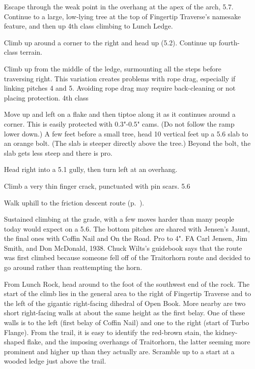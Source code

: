 \documentclass{tahquitz}
\begin{document}
 Escape through the weak point in the overhang at the apex
of the arch, 5.7. Continue to a large, low-lying tree at the top of Fingertip Traverse's
namesake feature, and then up 4th class climbing to Lunch Ledge.


 Climb up around a corner to the right and head up (5.2).
Continue up fourth-class terrain.

 Climb up from the middle of the ledge, surmounting all the steps
before traversing right. This variation creates problems with rope drag, especially
if linking pitches 4 and 5. Avoiding rope drag may require back-cleaning or not
placing protection. 4th class

 Move up and left on a flake and then tiptoe along it as it
continues around a corner.  This is easily protected with 0.3"-0.5"
cams. (Do not follow the ramp lower down.)  A few feet before a small
tree, head 10 vertical feet up a 5.6 slab to an orange bolt. (The slab
is steeper directly above the tree.) Beyond the bolt, the slab gets
less steep and there is pro. 

 Head right into a 5.1 gully, then turn left at an overhang.

 Climb a very thin finger crack, punctuated with pin scars. 5.6

Walk uphill to the friction descent route  (p.~\pageref{subsec:friction-descent}).





Sustained climbing at the grade, with a few moves harder than many
people today would expect on a 5.6. The bottom pitches are shared with
Jensen's Jaunt, the final ones with Coffin Nail and On the Road.  Pro
to 4".  FA Carl Jensen, Jim Smith, and Don McDonald, 1938. Chuck
Wilts's guidebook says that the route was first climbed because
someone fell off of the Traitorhorn route and decided to go around
rather than reattempting the horn. 

From Lunch Rock, head around to the foot of the southwest end of the
rock.  The start of the climb lies in the general area to the right of
Fingertip Traverse and to the left of the gigantic right-facing
dihedral of Open Book.  More nearby are two short right-facing walls
at about the same height as the first belay.  One of these walls is to
the left (first belay of Coffin Nail) and one to the right (start of
Turbo Flange).  From the trail, it is easy to identify the red-brown
stain, the kidney-shaped flake, and the imposing overhangs of
Traitorhorn, the latter seeming more prominent and higher up than they
actually are.  Scramble up to a start at a wooded ledge just above
the trail. 
\end{document}
